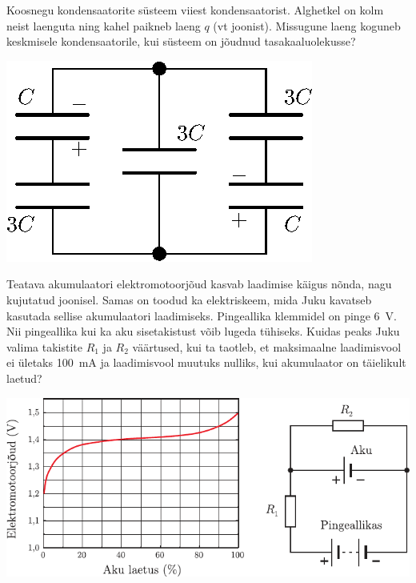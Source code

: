 \documentclass[10pt, twoside]{article}
\begin{document}
{\bigskip


Koosnegu kondensaatorite süsteem viiest kondensaatorist. Alghetkel on kolm neist laenguta ning kahel paikneb laeng $q$ (vt joonist). Missugune laeng koguneb keskmisele kondensaatorile, kui süsteem on jõudnud tasakaaluolekusse?

\begin{center}
	\includegraphics[width=0.42\linewidth]{2009-v3g-03-G_kondensaatorid.eps}
\end{center}
\probend
\bigskip


Teatava akumulaatori elektromotoorjõud kasvab laadimise käigus nõnda, nagu kujutatud joonisel. Samas on toodud ka elektriskeem, mida Juku kavatseb kasutada sellise akumulaatori laadimiseks. Pingeallika klemmidel on pinge \SI{6}{V}. Nii pingeallika kui ka aku sisetakistust võib lugeda tühiseks. Kuidas peaks Juku valima takistite $R_1$ ja $R_2$ väärtused, kui ta taotleb, et maksimaalne laadimisvool ei ületaks \SI{100}{mA} ja laadimisvool muutuks nulliks, kui akumulaator on täielikult laetud? 

\begin{center}
	\includegraphics[width=\linewidth]{2008-v2g-08-yl}
\end{center}
\probend
\bigskip

}
\end{document}
